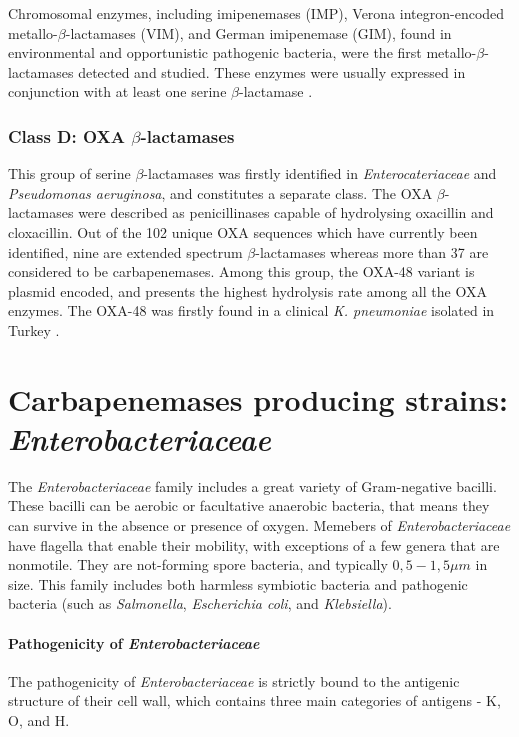 \documentclass[11pt]{report}
\begin{document}
Chromosomal enzymes, including imipenemases (IMP), Verona integron-encoded metallo-$\beta$-lactamases (VIM), and German imipenemase (GIM), found in environmental and opportunistic pathogenic bacteria, were the first metallo-$\beta$-lactamases detected and studied.
These enzymes were usually expressed in conjunction with at least one serine $\beta$-lactamase \cite{queenan2007}.

\subsection{Class D: OXA $\beta$-lactamases}
This group of serine $\beta$-lactamases was firstly identified in \emph{Enterocateriaceae} and \emph{Pseudomonas aeruginosa}, and constitutes a separate class.
The OXA $\beta$-lactamases were described as penicillinases capable of hydrolysing oxacillin and cloxacillin.
Out of the 102 unique OXA sequences which have currently been identified, nine are extended spectrum $\beta$-lactamases whereas more than 37 are considered to be carbapenemases.
Among this group, the OXA-48 variant is plasmid encoded, and presents the highest hydrolysis rate among all the OXA enzymes.
The OXA-48 was firstly found in a clinical \emph{K. pneumoniae} isolated in Turkey \cite{poirel2012}.

\chapter{Carbapenemases producing strains: \emph{Enterobacteriaceae}}
The \emph{Enterobacteriaceae} family includes a great variety of Gram-negative bacilli.
These bacilli can be aerobic or facultative anaerobic bacteria, that means they can survive in the absence or presence of oxygen.
Memebers of \emph{Enterobacteriaceae} have flagella that enable their mobility, with exceptions of a few genera that are nonmotile.
They are not-forming spore bacteria, and typically $0,5-1,5\mu m$ in size.
This family includes both harmless symbiotic bacteria and pathogenic bacteria (such as \emph{Salmonella}, \emph{Escherichia coli}, and \emph{Klebsiella}).

\subsubsection{Pathogenicity of \emph{Enterobacteriaceae}}

The pathogenicity of \emph{Enterobacteriaceae} is strictly bound to the antigenic structure of their cell wall, which contains three main categories of antigens - K, O, and H.
\end{document}

